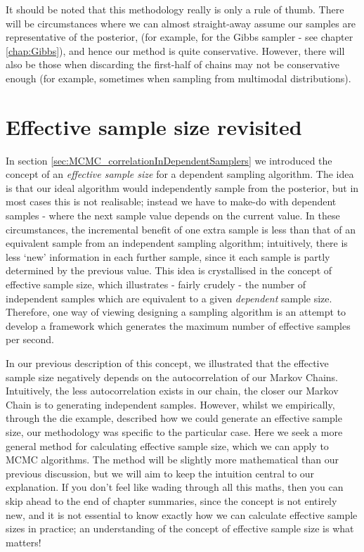 \documentclass[11pt,fullpage]{book}
\begin{document}
It should be noted that this methodology really is only a rule of thumb. There will be circumstances where we can almost straight-away assume our samples are representative of the posterior, (for example, for the Gibbs sampler - see chapter \ref{chap:Gibbs}), and hence our method is quite conservative. However, there will also be those when discarding the first-half of chains may not be conservative enough (for example, sometimes when sampling from multimodal distributions).

\section{Effective sample size revisited}\label{sec:MH_effectiveSampleSizeRevisited}
In section \ref{sec:MCMC_correlationInDependentSamplers} we introduced the concept of an \textit{effective sample size} for a dependent sampling algorithm. The idea is that our ideal algorithm would independently sample from the posterior, but in most cases this is not realisable; instead we have to make-do with dependent samples - where the next sample value depends on the current value. In these circumstances, the incremental benefit of one extra sample is less than that of an equivalent sample from an independent sampling algorithm; intuitively, there is less `new' information in each further sample, since it each sample is partly determined by the previous value. This idea is crystallised in the concept of effective sample size, which illustrates - fairly crudely - the number of independent samples which are equivalent to a given \textit{dependent} sample size. Therefore, one way of viewing designing a sampling algorithm is an attempt to develop a framework which generates the maximum number of effective samples per second. 

In our previous description of this concept, we illustrated that the effective sample size negatively depends on the autocorrelation of our Markov Chains. Intuitively, the less autocorrelation exists in our chain, the closer our Markov Chain is to generating independent samples. However, whilst we empirically, through the die example, described how we could generate an effective sample size, our methodology was specific to the particular case. Here we seek a more general method for calculating effective sample size, which we can apply to MCMC algorithms. The method will be slightly more mathematical than our previous discussion, but we will aim to keep the intuition central to our explanation. If you don't feel like wading through all this maths, then you can skip ahead to the end of chapter summaries, since the concept is not entirely new, and it is not essential to know exactly how we can calculate effective sample sizes in practice; an understanding of the concept of effective sample size is what matters!
\end{document}
